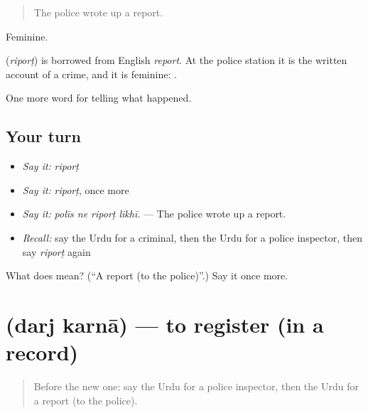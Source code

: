 \begin{quote}
The police wrote up a report.
\end{quote}

Feminine.

\begin{cousinweb}
\textbf{} (\emph{riporṭ}) is borrowed from English \emph{report}. At the police station it is the written account of a crime, and it is feminine: \textbf{ }.
\end{cousinweb}

\begin{grammarlens}[title={What you've built}]
One more word for telling what happened.
\end{grammarlens}

\subsection*{Your turn}
\begin{itemize}
\raggedright
  \item \emph{Say it:} \emph{riporṭ}
  \item \emph{Say it:} \emph{riporṭ}, once more
  \item \emph{Say it:} \emph{polīs ne riporṭ likhī.} — The police wrote up a report.
  \item \emph{Recall:} say the Urdu for a criminal, then the Urdu for a police inspector, then say \emph{riporṭ} again
\end{itemize}

\begin{tcolorbox}[breakable,colback=teal!4,colframe=teal!35!black,title={Before you move on}]
What does  mean? (\textquotedblleft{}A report (to the police)\textquotedblright{}.) Say it once more.
\end{tcolorbox}
\section[\texorpdfstring{\ur{درج} \ur{کرنا} (darj karnā)}{درج کرنا (darj karnā)}]{  (darj karnā) — to register (in a record)}

\label{lesson:UR-C278-darj-karna}



\begin{quote}
Before the new one: say the Urdu for a police inspector, then the Urdu for a report (to the police).
\end{quote}

